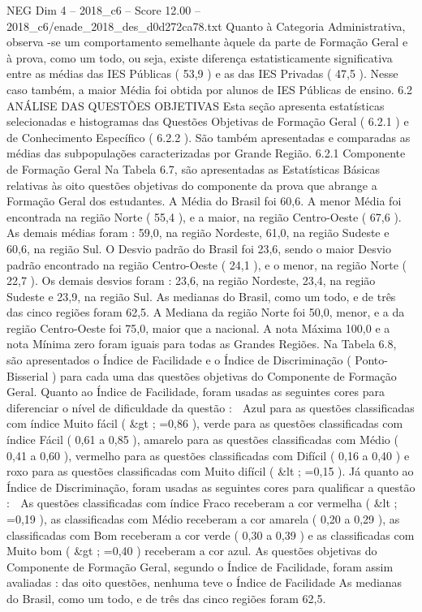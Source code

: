 \begin{textsample}{NEG Dim 4 – 2018\_c6 – Score 12.00 – 2018\_c6/enade\_2018\_des\_d0d272ca78.txt}
Quanto à Categoria Administrativa, observa -se um comportamento semelhante àquele da parte de Formação Geral e à prova, como um todo, ou seja, existe diferença estatisticamente significativa entre as médias das IES Públicas ( 53,9 ) e as das IES Privadas ( 47,5 ).
Nesse caso também, a maior Média foi obtida por alunos de IES Públicas de ensino. 6.2 ANÁLISE DAS QUESTÕES OBJETIVAS Esta seção apresenta estatísticas selecionadas e histogramas das Questões Objetivas de Formação Geral ( 6.2.1 ) e de Conhecimento Específico ( 6.2.2 ).
São também apresentadas e comparadas as médias das subpopulações caracterizadas por Grande Região. 6.2.1 Componente de Formação Geral Na Tabela 6.7, são apresentadas as Estatísticas Básicas relativas às oito questões objetivas do componente da prova que abrange a Formação Geral dos estudantes.
A Média do Brasil foi 60,6.
A menor Média foi encontrada na região Norte ( 55,4 ), e a maior, na região Centro-Oeste ( 67,6 ).
As demais médias foram : 59,0, na região Nordeste, 61,0, na região Sudeste e 60,6, na região Sul.
O Desvio padrão do Brasil foi 23,6, sendo o maior Desvio padrão encontrado na região Centro-Oeste ( 24,1 ), e o menor, na região Norte ( 22,7 ).
Os demais desvios foram : 23,6, na região Nordeste, 23,4, na região Sudeste e 23,9, na região Sul.
As medianas do Brasil, como um todo, e de três das cinco regiões foram 62,5.
A Mediana da região Norte foi 50,0, menor, e a da região Centro-Oeste foi 75,0, maior que a nacional.
A nota Máxima 100,0 e a nota Mínima zero foram iguais para todas as Grandes Regiões.
Na Tabela 6.8, são apresentados o Índice de Facilidade e o Índice de Discriminação ( Ponto-Bisserial ) para cada uma das questões objetivas do Componente de Formação Geral.
Quanto ao Índice de Facilidade, foram usadas as seguintes cores para diferenciar o nível de dificuldade da questão :  Azul para as questões classificadas com índice Muito fácil ( \&gt ; =0,86 ), verde para as questões classificadas com índice Fácil ( 0,61 a 0,85 ), amarelo para as questões classificadas com Médio ( 0,41 a 0,60 ), vermelho para as questões classificadas com Difícil ( 0,16 a 0,40 ) e roxo para as questões classificadas com Muito difícil ( \&lt ; =0,15 ).
Já quanto ao Índice de Discriminação, foram usadas as seguintes cores para qualificar a questão :  As questões classificadas com índice Fraco receberam a cor vermelha ( \&lt ; =0,19 ), as classificadas com Médio receberam a cor amarela ( 0,20 a 0,29 ), as classificadas com Bom receberam a cor verde ( 0,30 a 0,39 ) e as classificadas com Muito bom ( \&gt ; =0,40 ) receberam a cor azul.
As questões objetivas do Componente de Formação Geral, segundo o Índice de Facilidade, foram assim avaliadas : das oito questões, nenhuma teve o Índice de Facilidade As medianas do Brasil, como um todo, e de três das cinco regiões foram 62,5.

\end{textsample}
